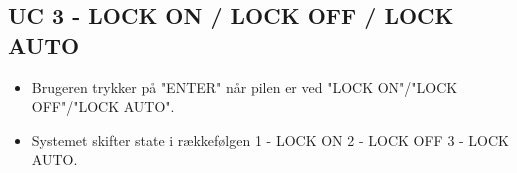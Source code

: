 \subsection{UC 3 - LOCK ON / LOCK OFF / LOCK AUTO}

\begin{itemize}
	\item Brugeren trykker på "ENTER" når pilen er ved "LOCK ON"/"LOCK OFF"/"LOCK AUTO".
	\item Systemet skifter state i rækkefølgen 1 - LOCK ON 2 - LOCK OFF 3 - LOCK AUTO.
\end{itemize}

%	
%	
%	
%	
%	
%	
%	
%	
%	
%	
%	
%	
